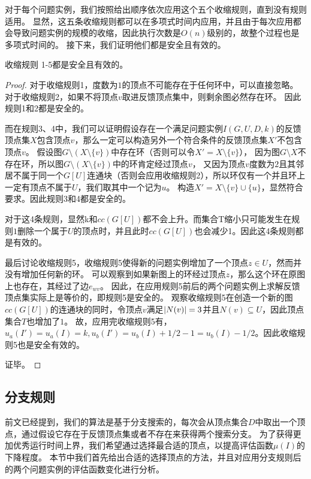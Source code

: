 对于每个问题实例，我们按照给出顺序依次应用这个五个收缩规则，直到没有规则适用。
显然，这五条收缩规则都可以在多项式时间内应用，并且由于每次应用都会导致问题实例的规模的收缩，因此执行次数是$O(n)$级别的，故整个过程也是多项式时间的。
接下来，我们证明他们都是安全且有效的。

\begin{lemma}
收缩规则 1-5都是安全且有效的。
\end{lemma}
\begin{proof}
对于收缩规则1，度数为$1$的顶点不可能存在于任何环中，可以直接忽略。
对于收缩规则2，如果不将顶点$v$取进反馈顶点集中，则剩余图必然存在环。
因此规则1和2都是安全的。

而在规则3、4中，我们可以证明假设存在一个满足问题实例$I(G, U, D, k)$的反馈顶点集$X$包含顶点$v$，那么一定可以构造另外一个符合条件的反馈顶点集$X'$不包含顶点$v$。
假设图$G \setminus (X \setminus \{v\})$中存在环（否则可以令$X' = X \setminus \{v\}$），
因为图$G \setminus X$不存在环，所以图$G \setminus (X \setminus \{v\})$中的环肯定经过顶点$v$，
又因为顶点$v$度数为$2$且其邻居不属于同一个$G[U]$连通块（否则会应用收缩规则2），所以环仅有一个并且环上一定有顶点不属于$U$，我们取其中一个记为$u$。
构造$X' = X \setminus \{v\} \cup \{u\}$，显然符合要求。因此规则3和4都是安全的。

对于这4条规则，显然k和$cc(G[U])$都不会上升。而集合T缩小只可能发生在规则$1$删除一个属于$U$的顶点时，并且此时$cc(G[U])$也会减少1。因此这4条规则都是有效的。

最后讨论收缩规则5，收缩规则5使得新的问题实例增加了一个顶点$z \in U$，然而并没有增加任何新的环。
可以观察到如果新图上的环经过顶点$z$，那么这个环在原图上也存在，其经过了边$e_{wv}$。
因此，在应用规则5前后的两个问题实例上求解反馈顶点集实际上是等价的，即规则5是安全的。
观察收缩规则5在创造一个新的图$cc(G[U])$的连通块的同时，令顶点$v$满足$\left\vert N(v) \right\vert = 3$并且$N(v) \subseteq U$，因此顶点集合$T$也增加了$1$。
故，应用完收缩规则5有，$u_a(I') = u_a(I) = k, u_b(I') = u_b(I) + 1/2 - 1 = u_b(I) - 1/2$。因此收缩规则5也是安全有效的。

证毕。
\end{proof}


\subsection{分支规则}
前文已经提到，我们的算法是基于分支搜索的，每次会从顶点集合$D$中取出一个顶点，通过假设它存在于反馈顶点集或者不存在来获得两个搜索分支。
为了获得更加优秀运行时间上界，我们希望通过选择最合适的顶点，以提高评估函数$\mu(I)$的下降程度。
本节中我们首先给出合适的选择顶点的方法，并且对应用分支规则后的两个问题实例的评估函数变化进行分析。

